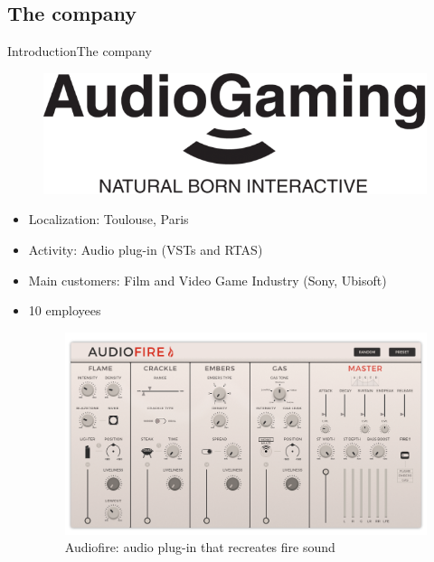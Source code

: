 \documentclass[10pt]{beamer}
\begin{document}
\subsection{The company}
\begin{frame}{Introduction}{The company}
	\begin{figure}
   	 \centering
  	 \includegraphics[scale=0.12]{ag.png}
	 \end{figure}
  \begin{itemize}
  \item<1-> Localization: Toulouse, Paris
  \item<1-> Activity: Audio plug-in (VSTs and RTAS)
  \item<1-> Main customers: Film and Video Game Industry (Sony, Ubisoft)
  \item<1-> 10 employees
	\begin{figure}
	\includegraphics[scale=0.12]{AudioFire_screen.png}
	\caption{Audiofire: audio plug-in that recreates fire sound}
	\end{figure}
  \end{itemize}
\end{frame}

\end{document}
